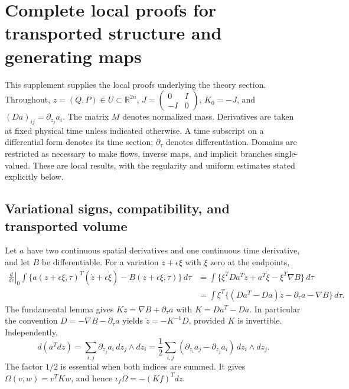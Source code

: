 \section{Complete local proofs for transported structure and generating maps}
\label{sec:sup-theory}

This supplement supplies the local proofs underlying the theory section. Throughout, $z=(Q,P)\in U\subset\mathbb R^{2n}$, $J=\left(\begin{smallmatrix}0&I\\-I&0\end{smallmatrix}\right)$, $K_0=-J$, and $(Da)_{ij}=\partial_{z_j}a_i$. The matrix $M$ denotes normalized mass. Derivatives are taken at fixed physical time unless indicated otherwise. A time subscript on a differential form denotes its time section; $\partial_\tau$ denotes differentiation. Domains are restricted as necessary to make flows, inverse maps, and implicit branches single-valued. These are local results, with the regularity and uniform estimates stated explicitly below.

\subsection{Variational signs, compatibility, and transported volume}
Let $a$ have two continuous spatial derivatives and one continuous time derivative, and let $B$ be differentiable. For a variation $z+\epsilon\xi$ with $\xi$ zero at the endpoints,
\begin{align}
 \left.\frac{d}{d\epsilon}\right|_0
 \int \{a(z+\epsilon\xi,\tau)^T(\dot z+\epsilon\dot\xi)-B(z+\epsilon\xi,\tau)\}\,d\tau
 &=\int\{\xi^TDa^T\dot z+a^T\dot\xi-\xi^T\nabla B\}\,d\tau\\
 &=\int\xi^T\{(Da^T-Da)\dot z-\partial_\tau a-\nabla B\}\,d\tau.
 \label{eq:sup-variation}
\end{align}
The fundamental lemma gives $K\dot z=\nabla B+\partial_\tau a$ with $K=Da^T-Da$. In particular the convention $D=-\nabla B-\partial_\tau a$ yields $\dot z=-K^{-1}D$, provided $K$ is invertible. Independently,
\begin{equation}
 d(a^Tdz)=\sum_{i,j}\partial_{z_j}a_i\,dz_j\wedge dz_i
 =\frac12\sum_{i,j}(\partial_{z_i}a_j-\partial_{z_j}a_i)\,dz_i\wedge dz_j.
 \label{eq:sup-twoform-factor}
\end{equation}
The factor $1/2$ is essential when both indices are summed. It gives $\Omega(v,w)=v^TKw$, and hence $\iota_f\Omega=-(Kf)^Tdz$.


